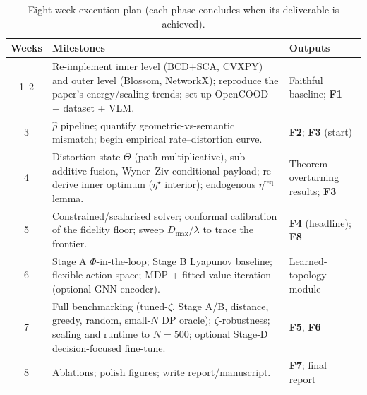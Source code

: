 \documentclass[11pt,a4paper]{article}
\begin{document}
\begin{table}[h]
\centering\footnotesize
\renewcommand{\arraystretch}{1.3}
\begin{tabular}{@{}c p{9.6cm} p{3.6cm}@{}}
\toprule
\textbf{Weeks} & \textbf{Milestones} & \textbf{Outputs} \\
\midrule
1--2 & Re-implement inner level (BCD+SCA, CVXPY) and outer level (Blossom, NetworkX); reproduce the paper's energy/scaling trends; set up OpenCOOD + dataset + VLM. & Faithful baseline; \textbf{F1} \\
3 & $\hat\rho$ pipeline; quantify geometric-vs-semantic mismatch; begin empirical rate--distortion curve. & \textbf{F2}; \textbf{F3} (start) \\
4 & Distortion state $\Theta$ (path-multiplicative), sub-additive fusion, Wyner--Ziv conditional payload; re-derive inner optimum ($\eta^{\star}$ interior); endogenous $\eta^{\mathrm{req}}$ lemma. & Theorem-overturning results; \textbf{F3} \\
5 & Constrained/scalarised solver; conformal calibration of the fidelity floor; sweep $D_{\max}/\lambda$ to trace the frontier. & \textbf{F4} (headline); \textbf{F8} \\
6 & Stage A $\Phi$-in-the-loop; Stage B Lyapunov baseline; flexible action space; MDP + fitted value iteration (optional GNN encoder). & Learned-topology module \\
7 & Full benchmarking (tuned-$\zeta$, Stage A/B, distance, greedy, random, small-$N$ DP oracle); $\zeta$-robustness; scaling and runtime to $N{=}500$; optional Stage-D decision-focused fine-tune. & \textbf{F5}, \textbf{F6} \\
8 & Ablations; polish figures; write report/manuscript. & \textbf{F7}; final report \\
\bottomrule
\end{tabular}
\caption{Eight-week execution plan (each phase concludes when its deliverable is achieved).}
\label{tab:weeks}
\end{table}

\end{document}
